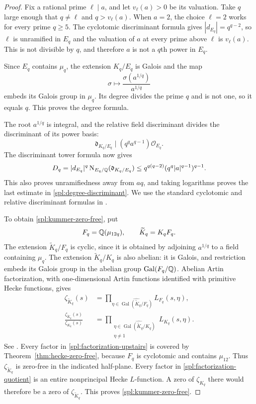 \begin{proof}
Fix a rational prime $\ell\mid a$, and let $v_\ell(a)>0$ be its
valuation. Take $q$ large enough that $q\ne\ell$ and $q>v_\ell(a)$.
When $a=2$, the choice $\ell=2$ works for every prime $q\ge5$.
The cyclotomic discriminant formula gives
$|d_{E_q}|=q^{q-2}$, so $\ell$ is unramified in $E_q$ and the valuation
of $a$ at every prime above $\ell$ is $v_\ell(a)$. This is not divisible
by $q$, and therefore $a$ is not a $q$th power in $E_q$.

Since $E_q$ contains $\mu_q$, the extension $K_q/E_q$ is Galois and
the map
\[
 \sigma\longmapsto\frac{\sigma(a^{1/q})}{a^{1/q}}
\]
embeds its Galois group in $\mu_q$. Its degree divides the prime $q$
and is not one, so it equals $q$. This proves the degree formula.

The root $a^{1/q}$ is integral, and the relative field discriminant
divides the discriminant of its power basis:
\[
 \mathfrak d_{K_q/E_q}
 \mid(q^q a^{q-1})\mathcal O_{E_q}.
\]
The discriminant tower formula now gives
\[
 D_q
 =|d_{E_q}|^q\operatorname{N}_{E_q/\mathbb{Q}}(\mathfrak d_{K_q/E_q})
 \le q^{q(q-2)}(q^q|a|^{q-1})^{q-1}.
\]
This also proves unramifiedness away from $aq$, and taking logarithms
proves the last estimate in \eqref{spl:degree-discriminant}. We use the
standard cyclotomic and relative discriminant formulas in
\cite[Chapter~I, \S10; Chapter~III, \S2]{Neukirch99}.

To obtain \eqref{spl:kummer-zero-free}, put
\[
 F_q=\mathbb{Q}(\mu_{12q}),\qquad \widetilde K_q=K_qF_q.
\]
The extension $\widetilde K_q/F_q$ is cyclic, since it is obtained by
adjoining $a^{1/q}$ to a field containing $\mu_q$. The extension
$\widetilde K_q/K_q$ is also abelian: it is Galois, and restriction
embeds its Galois group in the abelian group $\operatorname{Gal}(F_q/\mathbb{Q})$.
Abelian Artin factorization, with one-dimensional Artin functions
identified with primitive Hecke functions, gives
\begin{align}
 \zeta_{\widetilde K_q}(s)
 &=\prod_{\eta\in\widehat{\operatorname{Gal}(\widetilde K_q/F_q)}}
       L_{F_q}(s,\eta),\label{spl:factorization-upstairs}\\
 \frac{\zeta_{\widetilde K_q}(s)}{\zeta_{K_q}(s)}
 &=\prod_{\substack{\eta\in
         \widehat{\operatorname{Gal}(\widetilde K_q/K_q)}\\\eta\ne1}}
       L_{K_q}(s,\eta).
 \label{spl:factorization-quotient}
\end{align}
See \cite[Chapter~VII, Corollary~(10.5), Theorem~(10.6),
and the following remarks]{Neukirch99}.
Every factor in \eqref{spl:factorization-upstairs} is covered by
Theorem~\ref{thm:hecke-zero-free}, because $F_q$ is cyclotomic and contains
$\mu_{12}$. Thus $\zeta_{\widetilde K_q}$ is zero-free in the indicated
half-plane. Every factor in \eqref{spl:factorization-quotient} is an
entire nonprincipal Hecke $L$-function. A zero of $\zeta_{K_q}$ there
would therefore be a zero of $\zeta_{\widetilde K_q}$. This proves
\eqref{spl:kummer-zero-free}.
\end{proof}

